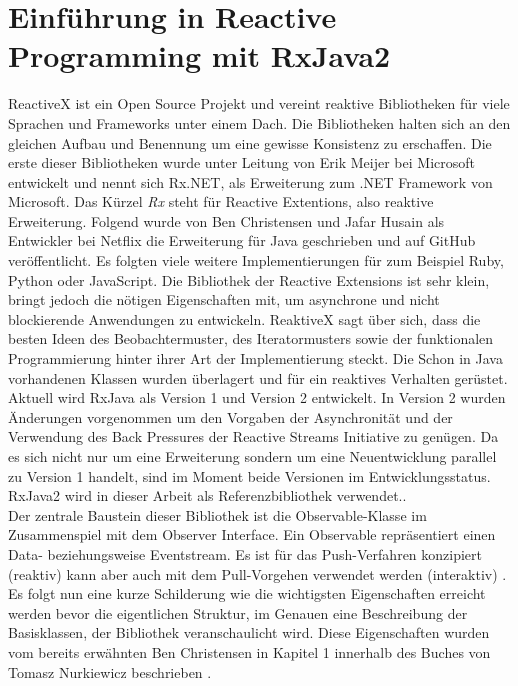 \chapter{Einführung in Reactive Programming mit RxJava2}\label{rp_einfuehrung}
ReactiveX ist ein Open Source Projekt und vereint reaktive Bibliotheken für viele Sprachen und Frameworks unter einem Dach. Die Bibliotheken halten sich an den gleichen Aufbau und Benennung um eine gewisse Konsistenz zu erschaffen. Die erste dieser Bibliotheken wurde unter Leitung von Erik Meijer bei Microsoft entwickelt und nennt sich Rx.NET, als Erweiterung zum .NET Framework von Microsoft. Das Kürzel \textit{Rx} steht für Reactive Extentions, also reaktive Erweiterung. Folgend wurde von Ben Christensen und Jafar Husain als Entwickler bei Netflix die Erweiterung für Java geschrieben und auf GitHub veröffentlicht. Es folgten viele weitere Implementierungen für zum Beispiel Ruby, Python oder JavaScript. Die Bibliothek der Reactive Extensions ist sehr klein, bringt jedoch die nötigen Eigenschaften mit, um asynchrone und nicht blockierende Anwendungen zu entwickeln. ReaktiveX sagt über sich, dass die besten Ideen des Beobachtermuster, des Iteratormusters sowie der funktionalen Programmierung hinter ihrer Art der Implementierung steckt. Die Schon in Java vorhandenen Klassen wurden überlagert und für ein reaktives Verhalten gerüstet. Aktuell wird RxJava als Version 1 und Version 2 entwickelt. In Version 2 wurden Änderungen vorgenommen um den Vorgaben der Asynchronität und der Verwendung des Back Pressures der Reactive Streams Initiative zu genügen. Da es sich nicht nur um eine Erweiterung sondern um eine Neuentwicklung parallel zu Version 1 handelt, sind im Moment beide Versionen im Entwicklungsstatus. RxJava2 wird in dieser Arbeit als Referenzbibliothek verwendet.\cite{rxgit}.\\ Der zentrale Baustein dieser Bibliothek ist die Observable-Klasse im Zusammenspiel mit dem Observer Interface. Ein Observable repräsentiert einen Data- beziehungsweise Eventstream. Es ist für das Push-Verfahren konzipiert (reaktiv) kann aber auch mit dem Pull-Vorgehen verwendet werden (interaktiv) \cite{Nurkiewicz.2017}. Es folgt nun eine kurze Schilderung wie die wichtigsten Eigenschaften erreicht werden bevor die eigentlichen Struktur, im Genauen eine Beschreibung der Basisklassen, der Bibliothek veranschaulicht wird. Diese Eigenschaften wurden vom bereits erwähnten Ben Christensen in Kapitel 1 innerhalb des Buches von Tomasz Nurkiewicz beschrieben \cite{Nurkiewicz.2017}. 
